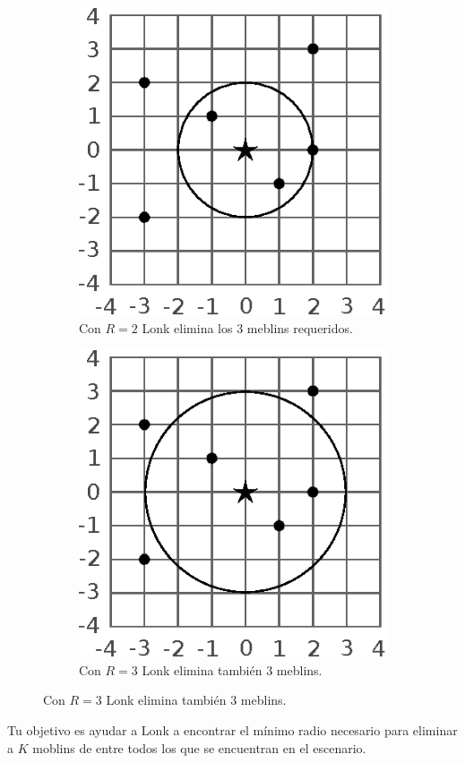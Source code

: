 \documentclass{oci}
\begin{document}
\begin{problemDescription}
  \begin{figure}[h]
    \centering
    \begin{subfigure}{0.3\textwidth}
      \centering
      \includegraphics[scale=0.8]{zolda2}
      \caption*{Con $R=2$ Lonk elimina los 3 meblins requeridos.}
    \end{subfigure}
    \hspace{3em}
    \begin{subfigure}{0.3\textwidth}
      \centering
      \includegraphics[scale=0.8]{zolda3}
      \caption*{Con $R=3$ Lonk elimina también 3 meblins.}
    \end{subfigure}
  \end{figure}

  Tu objetivo es ayudar a Lonk a encontrar el mínimo radio necesario para eliminar a $K$ moblins de entre todos los que se
  encuentran en el escenario.
\end{problemDescription}
\end{document}
